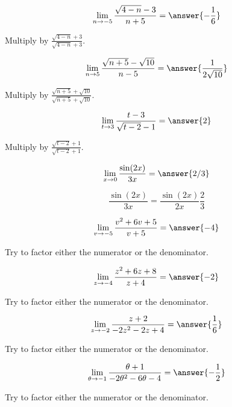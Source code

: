 \documentclass[handout]{ximera}
\begin{document}
\begin{exercise}
\[
\lim_{n\to -5 } \frac{\sqrt{4-n}-3}{n+5}= \answer{-\frac{1}{6}}
\]
\begin{hint}
Multiply by $\frac{\sqrt{4-n}+3}{\sqrt{4-n}+3}$.
\end{hint}
\end{exercise}

\begin{exercise}
\[
\lim_{n\to 5 } \frac{\sqrt{n+5}-\sqrt{10}}{n-5} = \answer{\frac{1}{2 \sqrt{10}}}
\]
\begin{hint}
Multiply by $\frac{\sqrt{n+5}+\sqrt{10}}{\sqrt{n+5}+\sqrt{10}}$.
\end{hint}
\end{exercise}


\begin{exercise}
\[
\lim_{t\to 3 } \frac{t-3}{\sqrt{t-2}-1} = \answer{2}
\]
\begin{hint}
Multiply by $\frac{\sqrt{t-2}+1}{\sqrt{t-2}+1}$.
\end{hint}
\end{exercise}

\begin{exercise}
\[\lim_{x \to 0} \frac{\sin(2x)}{3x} = \answer{2/3}\]

\begin{hint}
	\[\frac{\sin(2x)}{3x} = \frac{\sin(2x)}{2x} \frac{2}{3}\]
\end{hint}

\end{exercise}

\begin{exercise}
\[
\lim_{v\to -5 } \frac{v^2+6 v+5}{v+5} = \answer{-4}
\]
\begin{hint}
Try to factor either the numerator or the denominator.
\end{hint}
\end{exercise}

\begin{exercise}
\[
\lim_{z\to -4 } \frac{z^2+6 z+8}{z+4} = \answer{-2}
\]
\begin{hint}
Try to factor either the numerator or the denominator.
\end{hint}
\end{exercise}

\begin{exercise}
\[
\lim_{z\to -2 } \frac{z+2}{-2 z^2-2 z+4} = \answer{\frac{1}{6}}
\]
\begin{hint}
Try to factor either the numerator or the denominator.
\end{hint}
\end{exercise}


\begin{exercise}
\[
\lim_{\theta\to -1 } \frac{\theta +1}{-2 \theta ^2-6 \theta -4} = \answer{-\frac{1}{2}}
\]
\begin{hint}
Try to factor either the numerator or the denominator.
\end{hint}
\end{exercise}
\end{document}

